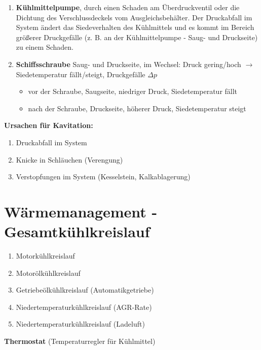 \begin{enumerate}
\item
  \textbf{Kühlmittelpumpe}, durch einen Schaden am Überdruckventil oder
  die Dichtung des Verschlussdeckels vom Ausgleichsbehälter. Der
  Druckabfall im System ändert das Siedeverhalten des Kühlmittels und es
  kommt im Bereich größerer Druckgefälle (z. B. an der Kühlmittelpumpe -
  Saug- und Druckseite) zu einem Schaden.
\item
  \textbf{Schiffsschraube} Saug- und Druckseite, im Wechsel: Druck
  gering/hoch $\to$ Siedetemperatur fällt/steigt, Druckgefälle
  $\Delta p$

  \begin{itemize}
  \item
    vor der Schraube, Saugseite, niedriger Druck, Siedetemperatur fällt
  \item
    nach der Schraube, Druckseite, höherer Druck, Siedetemperatur steigt
  \end{itemize}
\end{enumerate}

\textbf{Ursachen für Kavitation:}

\begin{enumerate}
\item
  Druckabfall im System
\item
  Knicke in Schläuchen (Verengung)
\item
  Verstopfungen im System (Kesselstein, Kalkablagerung)
\end{enumerate}

\newpage

\section{Wärmemanagement -
Gesamtkühlkreislauf}\label{waermemanagement-gesamtkuehlkreislauf}

\begin{enumerate}
\item
  Motorkühlkreislauf
\item
  Motorölkühlkreislauf
\item
  Getriebeölkühlkreislauf (Automatikgetriebe)
\item
  Niedertemperaturkühlkreislauf (AGR-Rate)
\item
  Niedertemperaturkühlkreislauf (Ladeluft)
\end{enumerate}

\textbf{Thermostat} (Temperaturregler für Kühlmittel)


